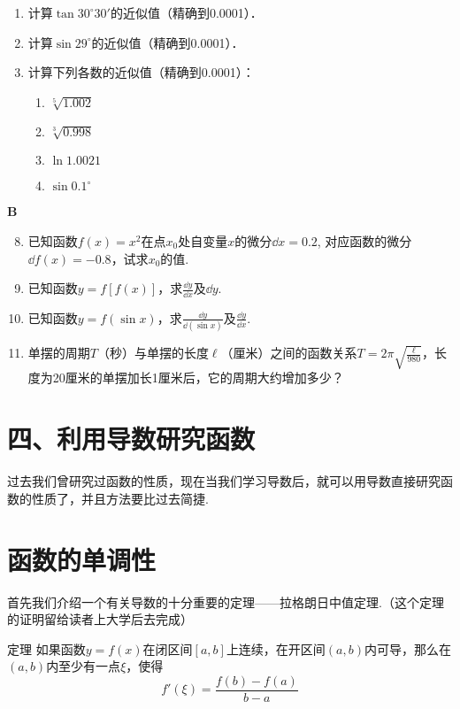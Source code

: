 \begin{enumerate}
\item 计算$\tan 30^{\circ}30'$的近似值（精确到0.0001）．
\item 计算$\sin29^{\circ}$的近似值（精确到0.0001）．
\item 计算下列各数的近似值（精确到0.0001）：
\begin{multicols}{2}
    \begin{enumerate}[(1)]
        \item $\sqrt[5]{1.002}$
        \item $\sqrt[3]{0.998}$
        \item $\ln1.0021$
        \item $\sin0.1^{\circ}$
    \end{enumerate}
\end{multicols}
\end{enumerate}

\begin{center}
    \bfseries B
\end{center}

\begin{enumerate}\setcounter{enumi}{7}
    \item 已知函数$f(x)=x^2$在点$x_0$处自变量$x$的微分$\dd x=0.2$, 对应函数的微分$\dd f(x)=-0.8$，试求$x_0$的值.
    \item   已知函数$y=f[f(x)]$，求$\frac{\dd y}{\dd x}$及$\dd y$.
        \item   已知函数$y=f(\sin x)$，求$\frac{\dd y}{\dd(\sin x)}$及$\frac{\dd y}{\dd x}$.
        \item  单摆的周期$T$（秒）与单摆的长度$\ell$（厘米）之间的函数关系$T=2\pi\sqrt{\frac{\ell}{980}}$，长度为20厘米的单摆加长1厘米后，它的周期大约增加多少？
\end{enumerate}

\section*{四、利用导数研究函数}
过去我们曾研究过函数的性质，现在当我们学习导数后，就可以用导数直接研究函数的性质了，并且方法要比过去简捷.

\section{函数的单调性}
首先我们介绍一个有关导数的十分重要的定理——拉格朗日中值定理.（这个定理的证明留给读者上大学后去完成）

\begin{thm}
    {定理} 如果函数$y=f(x)$在闭区间$[a,b]$上连续，在开区间$(a,b)$内可导，那么在$(a,b)$内至少有一点$\xi$，使得
    \[f'(\xi)=\frac{f(b)-f(a)}{b-a}\]  
\end{thm}

